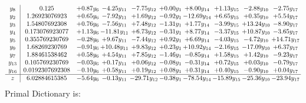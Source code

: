 \documentclass[9pt]{article}
\begin{document}
\[\begin{array}{c| c c@{\hskip 2pt} c@{\hskip 2pt} c@{\hskip 2pt} c@{\hskip 2pt} c@{\hskip 2pt} c@{\hskip 2pt} c@{\hskip 2pt} c@{\hskip 2pt} }
 y_{8}   &  0.125 & +  0.87 y_{6} & -4.25 y_{11} & -7.75 y_{12} & +  0.00 y_{1} & +  8.00 y_{14} & +  1.13 y_{15} & -2.88 y_{10} & -2.75 y_{17}\\
 y_{2}   &  1.26923076923 & +  0.65 y_{6} & -7.92 y_{11} & +  1.69 y_{12} & -0.92 y_{1} & -12.69 y_{14} & +  6.65 y_{15} & +  0.35 y_{10} & +  5.54 y_{17}\\
 y_{3}   &  1.54807692308 & +  0.76 y_{6} & -7.56 y_{11} & +  7.48 y_{12} & -1.31 y_{1} & +  1.77 y_{14} & -3.99 y_{15} & + 13.24 y_{10} & -8.90 y_{17}\\
 y_{4}   &  0.173076923077 & +  1.13 y_{6} & -11.81 y_{11} & +  6.73 y_{12} & -0.31 y_{1} & +  8.77 y_{14} & -3.37 y_{15} & + 10.87 y_{10} & -3.65 y_{17}\\
 y_{5}   &  0.355769230769 & -0.28 y_{6} & +  9.67 y_{11} & -7.44 y_{12} & +  0.92 y_{1} & +  6.69 y_{14} & -4.03 y_{15} & -4.72 y_{10} & + 14.71 y_{17}\\
 y_{9}   &  1.68269230769 & -0.91 y_{6} & + 10.48 y_{11} & +  9.83 y_{12} & +  0.23 y_{1} & + 10.92 y_{14} & -2.16 y_{15} & -17.09 y_{10} & +  6.37 y_{17}\\
 y_{7}   &  1.88461538462 & +  0.58 y_{6} & +  4.54 y_{11} & +  7.85 y_{12} & -1.46 y_{1} & -0.85 y_{14} & +  1.58 y_{15} & +  1.42 y_{10} & -9.23 y_{17}\\
 y_{13}   &  0.105769230769 & -0.03 y_{6} & +  0.17 y_{11} & +  0.06 y_{12} & -0.08 y_{1} & -0.31 y_{14} & +  0.72 y_{15} & +  0.03 y_{10} & -0.79 y_{17}\\
 y_{16}   &  0.0192307692308 & -0.10 y_{6} & +  0.58 y_{11} & +  0.19 y_{12} & +  0.08 y_{1} & +  0.31 y_{14} & +  0.40 y_{15} & -0.90 y_{10} & +  0.04 y_{17}\\
\hline
z    &  6.02884615385 & -5.64 y_{6} & -0.13 y_{11} & -29.71 y_{12} & -0.38 y_{1} & -78.54 y_{14} & -15.89 y_{15} & -25.36 y_{10} & -23.94 y_{17}\\
\end{array}\]
Primal Dictionary is:
\end{document}
